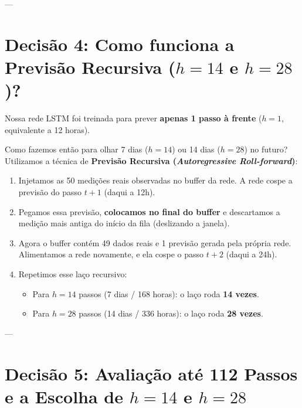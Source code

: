 \documentclass[10pt,a4paper]{article}
\begin{document}
---

\section{Decisão 4: Como funciona a Previsão Recursiva ($h=14$ e $h=28$)?}

\begin{decisaobox}
Nossa rede LSTM foi treinada para prever \textbf{apenas 1 passo à frente} ($h=1$, equivalente a 12 horas). 

Como fazemos então para olhar 7 dias ($h=14$) ou 14 dias ($h=28$) no futuro?
Utilizamos a técnica de \textbf{Previsão Recursiva (\textit{Autoregressive Roll-forward})}:
\begin{enumerate}[leftmargin=*,itemsep=1pt]
  \item Injetamos as 50 medições reais observadas no buffer da rede. A rede cospe a previsão do passo $t+1$ (daqui a 12h).
  \item Pegamos essa previsão, \textbf{colocamos no final do buffer} e descartamos a medição mais antiga do início da fila (deslizando a janela).
  \item Agora o buffer contém 49 dados reais e 1 previsão gerada pela própria rede. Alimentamos a rede novamente, e ela cospe o passo $t+2$ (daqui a 24h).
  \item Repetimos esse laço recursivo:
    \begin{itemize}[leftmargin=*,itemsep=0pt]
      \item Para $h=14$ passos (7 dias / 168 horas): o laço roda \textbf{14 vezes}.
      \item Para $h=28$ passos (14 dias / 336 horas): o laço roda \textbf{28 vezes}.
    \end{itemize}
\end{enumerate}
\end{decisaobox}

---

\section{Decisão 5: Avaliação até 112 Passos e a Escolha de $h=14$ e $h=28$}
\end{document}
